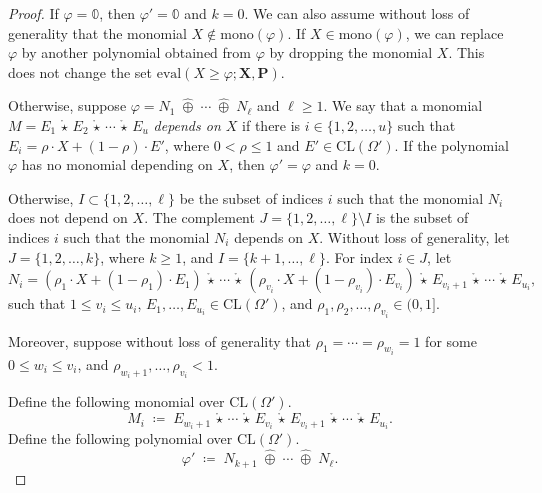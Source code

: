 \documentclass[10pt]{amsart}
\theoremstyle{plain}
\theoremstyle{definition}
\providecommand{\bP}[0]{\ensuremath{\mathbf P}\xspace}
\providecommand{\bX}[0]{\ensuremath{\mathbf X}\xspace}
\let\leq\leqslant
\let\geq\geqslant
\providecommand{\defeq}[0]{\ensuremath{\;\coloneqq\;}\xspace}
\providecommand{\cplus}[0]{\ensuremath{\hat{\oplus}}\xspace}
\providecommand{\cmult}[0]{\ensuremath{{\,\mathring{\star}\,}}\xspace}
\providecommand{\CL}[0]{\ensuremath{\mathrm{CL}}\xspace}
\providecommand{\evalmap}[0]{\ensuremath{\mathrm{eval}}\xspace}
\providecommand{\mono}[0]{\ensuremath{\mathrm{mono}}\xspace}
\begin{document}
\begin{proof}
    If $\varphi=\mathbb{0}$, then $\varphi'=\mathbb{0}$ and $k=0$. 
    We can also assume without loss of generality that the monomial 
    $X \not\in\mono(\varphi)$.
    If $X \in \mono(\varphi)$, we can replace $\varphi$ by another polynomial
    obtained from $\varphi$ by dropping the monomial $X$. This does not change the set $\evalmap(X\geq \varphi; \bX,\bP)$.

    
    Otherwise, suppose $\varphi = N_1 \;\cplus\; \dotsi \;\cplus\; N_\ell$ and $\ell\geq 1$. 
    We say that a monomial $M=E_1\cmult E_2\cmult \dotsi \cmult E_u$ {\em depends on $X$} if there is $i\in\{1,2,\dotsc, u\}$ such that $E_i = \rho\cdot X + (1-\rho)\cdot E'$, where $0<\rho\leq 1$ and $E'\in\CL(\Omega')$.
    If the polynomial $\varphi$ has no monomial depending on $X$, then $\varphi'=\varphi$ and $k=0$. 

    Otherwise, $I\subset \{1,2,\dotsc,\ell\}$ be the subset of indices $i$ such that the monomial $N_i$ does not depend on $X$.  
    The complement $J =\{1,2,\dotsc,\ell\}\setminus I$ is the subset of indices $i$ such that the monomial $N_i$ depends on $X$. 
    Without loss of generality, let $J = \{1,2,\dotsc,k\}$, where $k\geq 1$, and $I =\{k+1,\dotsc,\ell\}$. 
    For index $i\in J$, let
    $$N_i = \left(\rho_1\cdot X + (1-\rho_1)\cdot E_1\right) 
                    \cmult \dotsi \cmult
                \left(\rho_{v_i}\cdot X + (1-\rho_{v_i})\cdot E_{v_i}\right) \cmult E_{v_i+1} \cmult \dotsi \cmult E_{u_i},$$ 
    such that $1\leq v_i\leq u_i$, $E_1, \dotsc, E_{u_i} \in \CL(\Omega')$, and $\rho_1, \rho_2,\dotsc, \rho_{v_i}\in(0,1]$.

    Moreover, suppose without loss of generality that 
    $\rho_1 = \cdots = \rho_{w_i} =1$ for some $0 \leq w_i\leq v_i$,
    and $\rho_{w_i +1}, \ldots,\rho_{v_i} < 1$.
    
    Define the following monomial over $\CL(\Omega')$. 
        $$ M_i \defeq E_{w_i+1} \cmult \dotsi \cmult E_{v_i} \cmult E_{v_i+1}\cmult \dotsi \cmult E_{u_i}.$$
    Define the following polynomial over $\CL(\Omega')$. 
        $$\varphi' \defeq N_{k+1} \;\cplus\; \dotsi \;\cplus\; N_\ell.$$
    

\end{proof}
\end{document}
